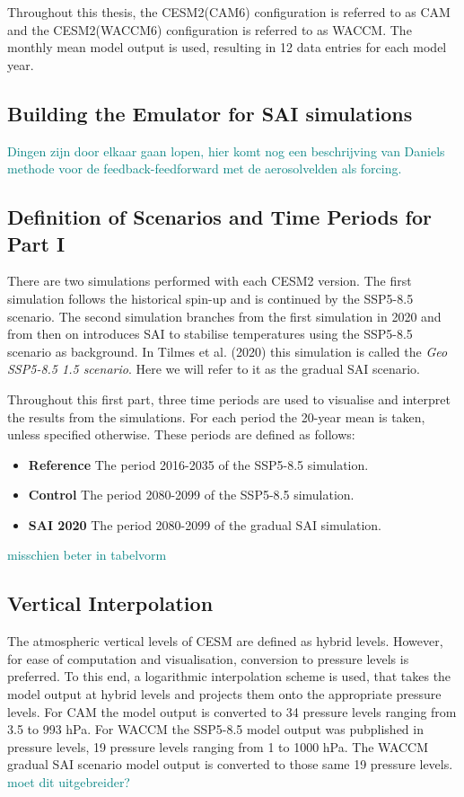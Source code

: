 Throughout this thesis, the CESM2(CAM6) configuration is referred to as CAM and the CESM2(WACCM6) configuration is referred to as WACCM. The monthly mean model output is used, resulting in 12 data entries for each model year. 

\subsection{Building the Emulator for SAI simulations}
\textcolor{teal}{Dingen zijn door elkaar gaan lopen, hier komt nog een beschrijving van Daniels methode voor de feedback-feedforward met de aerosolvelden als forcing.}

\subsection{Definition of Scenarios and Time Periods for Part I}
There are two simulations performed with each CESM2 version. The first simulation follows the historical spin-up and is continued by the SSP5-8.5 scenario. The second simulation branches from the first simulation in 2020 and from then on introduces SAI to stabilise temperatures using the SSP5-8.5 scenario as background. In Tilmes et al. (2020) this simulation is called the \textit{Geo SSP5-8.5 1.5 scenario}. Here we will refer to it as the gradual SAI scenario. 

Throughout this first part, three time periods are used to visualise and interpret the results from the simulations. For each period the 20-year mean is taken, unless specified otherwise. These periods are defined as follows:

\begin{itemize}
    \item \textbf{Reference} The period 2016-2035 of the SSP5-8.5 simulation.
    \item \textbf{Control} The period 2080-2099 of the SSP5-8.5 simulation.
    \item \textbf{SAI 2020} The period 2080-2099 of the gradual SAI simulation.
\end{itemize} 
\textcolor{teal}{misschien beter in tabelvorm}

\subsection{Vertical Interpolation}
The atmospheric vertical levels of CESM are defined as hybrid levels. However, for ease of computation and visualisation, conversion to pressure levels is preferred. To this end, a logarithmic interpolation scheme is used, that takes the model output at hybrid levels and projects them onto the appropriate pressure levels. For CAM the model output is converted to 34 pressure levels ranging from 3.5 to 993 hPa. For WACCM the SSP5-8.5 model output was pubplished in pressure levels, 19 pressure levels ranging from 1 to 1000 hPa. The WACCM gradual SAI scenario model output is converted to those same 19 pressure levels. \textcolor{teal}{moet dit uitgebreider?}

